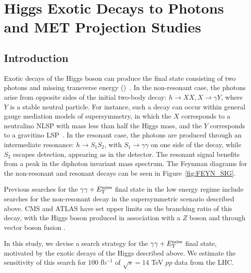 \section{Higgs Exotic Decays to Photons and MET Projection Studies}
\subsection{Introduction}

Exotic decays of the Higgs boson can produce the final state consisting of two photons and missing transverse energy (\MET)~\cite{Curtin:2013fra}. 
%
In the non-resonant case, the photons arise from opposite sides of the initial two-body decay: $h\to XX, X\to\gamma Y$, where $Y$ is a stable neutral particle. For instance, such a decay can occur within general gauge mediation models of supersymmetry, in which the $X$ corresponds to a neutralino NLSP with mass less than half the Higgs mass, and the $Y$ corresponds to a gravitino LSP~\cite{Djouadi:1997gw, Mason:2009qh, Petersson:2012dp}.
%
In the resonant case, the photons are produced through an intermediate resonance: $h\to S_1 S_2$, with $S_1 \to\gamma\gamma$ on one side of the decay, while $S_2$ escapes detection, appearing as \MET in the detector. The resonant signal benefits from a peak in the diphoton invariant mass spectrum. 
The Feynman diagrams for the non-resonant and resonant decays can be seen in Figure~\ref{fig:FEYN_SIG}.

Previous searches for the $\gamma\gamma+E_{\mathrm{T}}^{\text{miss}}$ final state in the low energy regime include searches for the non-resonant decay in the supersymmetric scenario described above. CMS and ATLAS have set upper limits on the branching ratio of this decay, with the Higgs boson produced in association with a $Z$ boson \cite{lowmonophoton} and through vector boson fusion \cite{ATLAS:2015bra}.

In this study, we devise a search strategy for the $\gamma\gamma+E_{\mathrm{T}}^{\text{miss}}$ final state, motivated by the exotic decays of the Higgs described above. We estimate the sensitivity of this search for $100$ fb$^{-1}$ of $\sqrt{s}=14$ TeV $pp$ data from the LHC.


